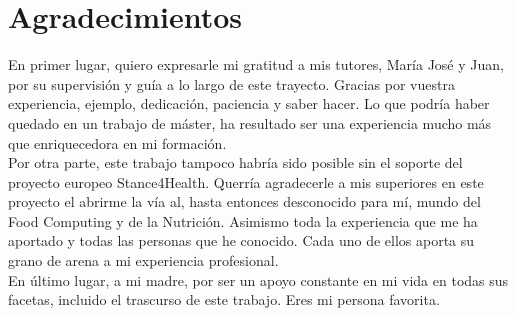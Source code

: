 \chapter*{Agradecimientos}
\thispagestyle{empty}

       \vspace{1cm}

En primer lugar, quiero expresarle mi gratitud a mis tutores, María José y Juan, por su supervisión y guía a lo largo de este trayecto. Gracias por vuestra experiencia, ejemplo,  dedicación, paciencia y saber hacer. Lo que podría haber quedado en un trabajo de máster, ha resultado ser una experiencia mucho más que enriquecedora en mi formación.\\

Por otra parte, este trabajo tampoco habría sido posible sin el soporte del proyecto europeo Stance4Health. Querría agradecerle a mis superiores en este proyecto el abrirme la vía al, hasta entonces desconocido para mí, mundo del Food Computing y de la Nutrición. Asimismo toda la experiencia que me ha aportado y todas las personas que he conocido. Cada uno de ellos aporta su grano de arena a mi experiencia profesional. \\

En último lugar, a mi madre, por ser un apoyo constante en mi vida en todas sus facetas, incluido el trascurso de este trabajo. Eres mi persona favorita. 

